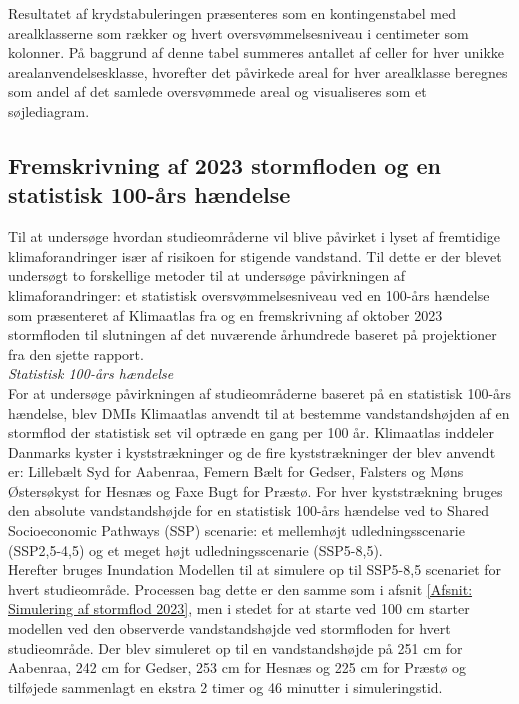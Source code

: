 Resultatet af krydstabuleringen præsenteres som en kontingenstabel med arealklasserne som rækker og hvert oversvømmelsesniveau i centimeter som kolonner. På baggrund af denne tabel summeres antallet af celler for hver unikke arealanvendelsesklasse, hvorefter det påvirkede areal for hver arealklasse beregnes som andel af det samlede oversvømmede areal og visualiseres som et søjlediagram. 

\subsection{Fremskrivning af 2023 stormfloden og en statistisk 100-års hændelse} \label{Afsnit: Fremskrivning og statistisk}

Til at undersøge hvordan studieområderne vil blive påvirket i lyset af fremtidige klimaforandringer især af risikoen for stigende vandstand. Til dette er der blevet undersøgt to forskellige metoder til at undersøge påvirkningen af klimaforandringer: et statistisk oversvømmelsesniveau ved en 100-års hændelse som præsenteret af Klimaatlas fra \cite{dmi_data_2025} og en fremskrivning af oktober 2023 stormfloden til slutningen af det nuværende århundrede baseret på projektioner fra den sjette \cite{ipcc_report_AR6} rapport.\\

{\large \textit{Statistisk 100-års hændelse}}\\
For at undersøge påvirkningen af studieområderne baseret på en statistisk 100-års hændelse, blev DMIs Klimaatlas anvendt til at bestemme vandstandshøjden af en stormflod der statistisk set vil optræde en gang per 100 år. Klimaatlas inddeler Danmarks kyster i kyststrækninger og de fire kyststrækninger der blev anvendt er: Lillebælt Syd for Aabenraa, Femern Bælt for Gedser, Falsters og Møns Østersøkyst for Hesnæs og Faxe Bugt for Præstø. For hver kyststrækning bruges den absolute vandstandshøjde for en statistisk 100-års hændelse ved to Shared Socioeconomic Pathways (SSP) scenarie: et mellemhøjt udledningsscenarie (SSP2,5-4,5) og et meget højt udledningsscenarie (SSP5-8,5). \\
Herefter bruges Inundation Modellen til at simulere op til SSP5-8,5 scenariet for hvert studieområde. Processen bag dette er den samme som i afsnit \ref{Afsnit: Simulering af stormflod 2023}, men i stedet for at starte ved 100 cm starter modellen ved den observerde vandstandshøjde ved stormfloden for hvert studieområde. Der blev simuleret op til en vandstandshøjde på 251 cm for Aabenraa, 242 cm for Gedser, 253 cm for Hesnæs og 225 cm for Præstø og tilføjede sammenlagt en ekstra 2 timer og 46 minutter i simuleringstid. \\

